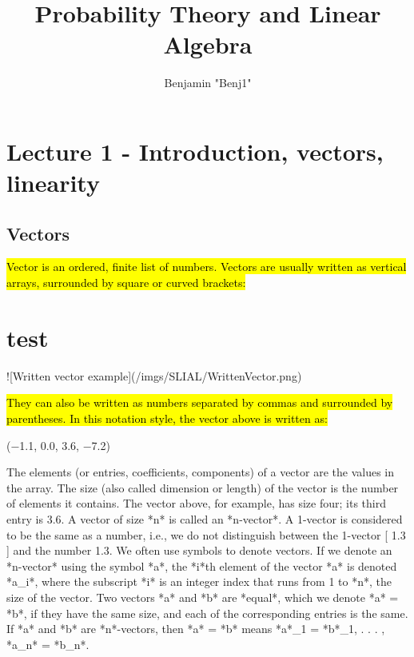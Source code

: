 \documentclass{article}
\title{Probability Theory and Linear Algebra}
\author{Benjamin "Benj1"}
\begin{document}
\maketitle
\section*{Lecture 1 - Introduction, vectors, linearity} 
\subsection*{Vectors}

\hl{Vector is an ordered, finite list of numbers. Vectors are usually written as vertical arrays, surrounded by square or curved brackets:}
\section*{test}
\newline 
![Written vector example](/imgs/SLIAL/WrittenVector.png)

\newline 
\hl{They can also be written as numbers separated by commas and surrounded by parentheses. In this notation style, the vector above is written as: }

\newline 
	(−1.1, 0.0, 3.6, −7.2)

\newline 
The elements (or entries, coefficients, components) of a vector are the values in the array. The size (also called dimension or length) of the vector is the number of
elements it contains. The vector above, for example, has size four; its third entry is 3.6. A vector of size *n* is called an *n-vector*. A 1-vector is considered to be the
same as a number, i.e., we do not distinguish between the 1-vector [ 1.3 ] and the number 1.3.
\newline 
We often use symbols to denote vectors. If we denote an *n-vector* using the symbol *a*, the *i*th element of the vector *a* is denoted *a_i*, where the subscript *i* is an integer index that runs from 1 to *n*, the size of the vector.
Two vectors *a* and *b* are *equal*, which we denote *a* = *b*, if they have the same size, and each of the corresponding entries is the same. If *a* and *b* are *n*-vectors, then *a* = *b* means *a*_1 = *b*_1, . . . , *a_n* = *b_n*.
\end{document}
